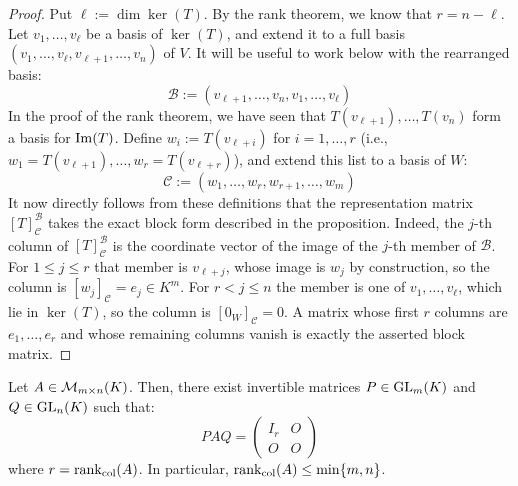 \begin{proof}
Put $\ell := \dim \ker(T)$. By the rank theorem, we know that $r = n - \ell$. Let $v_1, \dots, v_\ell$ be a basis of $\ker(T)$, and extend it to a full basis $(v_1, \dots, v_\ell, v_{\ell+1}, \dots, v_n)$ of $V$. It will be useful to work below with the rearranged basis:
\begin{equation*}
    \mathcal{B} := (v_{\ell+1}, \dots, v_n, v_1, \dots, v_\ell)
\end{equation*}
In the proof of the rank theorem, we have seen that $T(v_{\ell+1}), \dots, T(v_n)$ form a basis for $\operatorname{Im}(T)$. Define $w_i := T(v_{\ell+i})$ for $i = 1, \dots, r$ (i.e., $w_1 = T(v_{\ell+1}), \dots, w_r = T(v_{\ell+r})$), and extend this list to a basis of $W$:
\begin{equation*}
    \mathcal{C} := (w_1, \dots, w_r, w_{r+1}, \dots, w_m)
\end{equation*}
It now directly follows from these definitions that the representation matrix $[T]_{\mathcal{C}}^{\mathcal{B}}$ takes the exact block form described in the proposition. Indeed, the $j$-th column of $[T]_{\mathcal{C}}^{\mathcal{B}}$ is the coordinate vector of the image of the $j$-th member of $\mathcal{B}$. For $1 \le j \le r$ that member is $v_{\ell+j}$, whose image is $w_j$ by construction, so the column is $[w_j]_{\mathcal{C}} = e_j \in K^m$. For $r < j \le n$ the member is one of $v_1, \dots, v_\ell$, which lie in $\ker(T)$, so the column is $[0_W]_{\mathcal{C}} = 0$. A matrix whose first $r$ columns are $e_1, \dots, e_r$ and whose remaining columns vanish is exactly the asserted block matrix.
\end{proof}

\begin{corollary}
\label{cor:matrix_equivalence_normal_form}
Let $A \in \mathcal{M}_{m \times n}(K)$. Then, there exist invertible matrices $P \in \operatorname{GL}_m(K)$ and $Q \in \operatorname{GL}_n(K)$ such that:
\begin{equation*}
    PAQ = \begin{pmatrix} I_r & O \\ O & O \end{pmatrix}
\end{equation*}
where $r = \operatorname{rank}_{\text{col}}(A)$. In particular, $\operatorname{rank}_{\text{col}}(A) \le \min\{m, n\}$.
\end{corollary}

